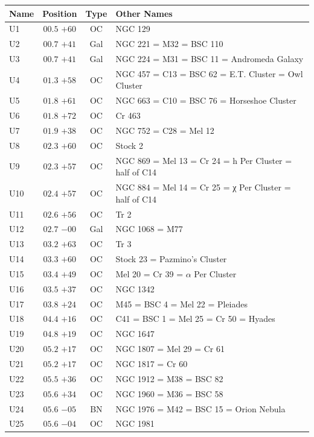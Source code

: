 
\begin{table}[t]
    \setlength{\tabcolsep}{2pt}
    \footnotesize
    \begin{tabularx}{\linewidth}{lccX}
        \hline
        Name&Position&Type&Other Names\\
        \hline

U1   &$00.5$ $+60$&OC &NGC 129\\
U2   &$00.7$ $+41$&Gal&NGC 221 = M32 = BSC 110\\
U3   &$00.7$ $+41$&Gal&NGC 224 = M31 = BSC 11 = Andromeda Galaxy\\
U4   &$01.3$ $+58$&OC &NGC 457 = C13 = BSC 62 = E.T. Cluster = Owl Cluster\\
U5   &$01.8$ $+61$&OC &NGC 663 = C10 = BSC 76 = Horseshoe Cluster\\
U6   &$01.8$ $+72$&OC &Cr 463\\
U7   &$01.9$ $+38$&OC &NGC 752 = C28 = Mel 12\\
U8   &$02.3$ $+60$&OC &Stock 2\\
U9   &$02.3$ $+57$&OC &NGC 869 = Mel 13 = Cr 24 = h Per Cluster = half of C14\\
U10  &$02.4$ $+57$&OC &NGC 884 = Mel 14 = Cr 25 = χ Per Cluster = half of C14\\
U11  &$02.6$ $+56$&OC &Tr 2\\
U12  &$02.7$ $-00$&Gal&NGC 1068 = M77\\
U13  &$03.2$ $+63$&OC &Tr 3\\
U14  &$03.3$ $+60$&OC &Stock 23 = Pazmino's Cluster\\
U15  &$03.4$ $+49$&OC &Mel 20 = Cr 39 = $\alpha$ Per Cluster\\
U16  &$03.5$ $+37$&OC &NGC 1342\\
U17  &$03.8$ $+24$&OC &M45 = BSC 4 = Mel 22 = Pleiades\\
U18  &$04.4$ $+16$&OC &C41 = BSC 1 = Mel 25 = Cr 50 = Hyades\\
U19  &$04.8$ $+19$&OC &NGC 1647\\
U20  &$05.2$ $+17$&OC &NGC 1807 = Mel 29 = Cr 61\\
U21  &$05.2$ $+17$&OC &NGC 1817 = Cr 60\\
U22  &$05.5$ $+36$&OC &NGC 1912 = M38 = BSC 82\\
U23  &$05.6$ $+34$&OC &NGC 1960 = M36 = BSC 58\\
U24  &$05.6$ $-05$&BN &NGC 1976 = M42 = BSC 15 = Orion Nebula\\
U25  &$05.6$ $-04$&OC &NGC 1981\\

\end{tabularx}
\end{table}
